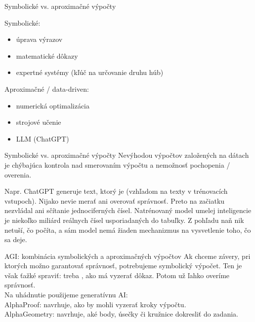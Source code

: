 \documentclass[12pt]{beamer}
\theoremstyle{definition}
\begin{document}
\begin{frame}{Symbolické vs. aproximačné výpočty}
\begin{minipage}[t]{0.45\textwidth}
Symbolické:
\begin{itemize}
	\item úprava výrazov
	\item matematické dôkazy
	\item expertné systémy (kľúč na určovanie druhu húb)
\end{itemize}
\end{minipage}
\quad
\begin{minipage}[t]{0.45\textwidth}
Aproximačné / data-driven:
\begin{itemize}
	\item numerická optimalizácia
	\item strojové učenie
	\item LLM (ChatGPT)
\end{itemize}
\end{minipage}
\end{frame}

\begin{frame}{Symbolické vs. aproximačné výpočty}
Nevýhodou výpočtov založených na dátach je chýbajúca kontrola nad smerovaním výpočtu a nemožnosť pochopenia / overenia.

Napr. ChatGPT generuje text, ktorý je  (vzhľadom na texty v trénovacích vstupoch). Nijako nevie merať ani overovať správnosť. Preto na začiatku nezvládal ani sčítanie jednociferných čísel. Natrénovaný model umelej inteligencie je niekoľko miliárd reálnych čísel usporiadaných do tabuľky. Z pohľadu naň nik netuší, čo počíta, a sám model nemá žiaden mechanizmus na vysvetlenie toho, čo sa deje.
\end{frame}

\begin{frame}{AGI: kombinácia symbolických a aproximačných výpočtov}
Ak chceme závery, pri ktorých možno garantovať správnosť, potrebujeme symbolický výpočet. Ten je však ťažké spraviť: treba , ako má vyzerať dôkaz. Potom už ľahko overíme správnosť.\\[3mm]

Na uhádnutie použijeme generatívnu AI:\\
AlphaProof: navrhuje, ako by mohli vyzerať kroky výpočtu.\\
AlphaGeometry: navrhuje, aké body, úsečky či kružnice dokresliť do zadania.
\end{frame}
\end{document}
